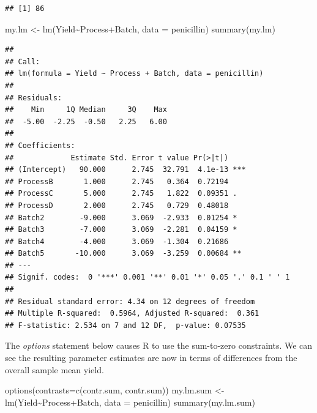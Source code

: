 \documentclass[
]{book}
\newenvironment{Shaded}{\begin{snugshade}}{\end{snugshade}}
\newcommand{\AttributeTok}[1]{\textcolor[rgb]{0.77,0.63,0.00}{#1}}
\newcommand{\FunctionTok}[1]{\textcolor[rgb]{0.00,0.00,0.00}{#1}}
\newcommand{\NormalTok}[1]{#1}
\newcommand{\OtherTok}[1]{\textcolor[rgb]{0.56,0.35,0.01}{#1}}
\newcommand{\SpecialCharTok}[1]{\textcolor[rgb]{0.00,0.00,0.00}{#1}}
\newcommand{\StringTok}[1]{\textcolor[rgb]{0.31,0.60,0.02}{#1}}
\begin{document}
\begin{verbatim}
## [1] 86
\end{verbatim}

\begin{Shaded}
\begin{Highlighting}[]
\NormalTok{my.lm }\OtherTok{\textless{}{-}} \FunctionTok{lm}\NormalTok{(Yield}\SpecialCharTok{\textasciitilde{}}\NormalTok{Process}\SpecialCharTok{+}\NormalTok{Batch, }\AttributeTok{data =}\NormalTok{ penicillin)}
\FunctionTok{summary}\NormalTok{(my.lm)}
\end{Highlighting}
\end{Shaded}

\begin{verbatim}
## 
## Call:
## lm(formula = Yield ~ Process + Batch, data = penicillin)
## 
## Residuals:
##    Min     1Q Median     3Q    Max 
##  -5.00  -2.25  -0.50   2.25   6.00 
## 
## Coefficients:
##             Estimate Std. Error t value Pr(>|t|)    
## (Intercept)   90.000      2.745  32.791  4.1e-13 ***
## ProcessB       1.000      2.745   0.364  0.72194    
## ProcessC       5.000      2.745   1.822  0.09351 .  
## ProcessD       2.000      2.745   0.729  0.48018    
## Batch2        -9.000      3.069  -2.933  0.01254 *  
## Batch3        -7.000      3.069  -2.281  0.04159 *  
## Batch4        -4.000      3.069  -1.304  0.21686    
## Batch5       -10.000      3.069  -3.259  0.00684 ** 
## ---
## Signif. codes:  0 '***' 0.001 '**' 0.01 '*' 0.05 '.' 0.1 ' ' 1
## 
## Residual standard error: 4.34 on 12 degrees of freedom
## Multiple R-squared:  0.5964, Adjusted R-squared:  0.361 
## F-statistic: 2.534 on 7 and 12 DF,  p-value: 0.07535
\end{verbatim}

The \emph{options} statement below causes R to use the sum-to-zero constraints. We can see the resulting parameter estimates are now in terms of differences from the overall sample mean yield.

\begin{Shaded}
\begin{Highlighting}[]
\FunctionTok{options}\NormalTok{(}\AttributeTok{contrasts=}\FunctionTok{c}\NormalTok{(}\StringTok{\textquotesingle{}contr.sum\textquotesingle{}}\NormalTok{, }\StringTok{\textquotesingle{}contr.sum\textquotesingle{}}\NormalTok{))}
\NormalTok{my.lm.sum }\OtherTok{\textless{}{-}} \FunctionTok{lm}\NormalTok{(Yield}\SpecialCharTok{\textasciitilde{}}\NormalTok{Process}\SpecialCharTok{+}\NormalTok{Batch, }\AttributeTok{data =}\NormalTok{ penicillin)}
\FunctionTok{summary}\NormalTok{(my.lm.sum)}
\end{Highlighting}
\end{Shaded}
\end{document}
